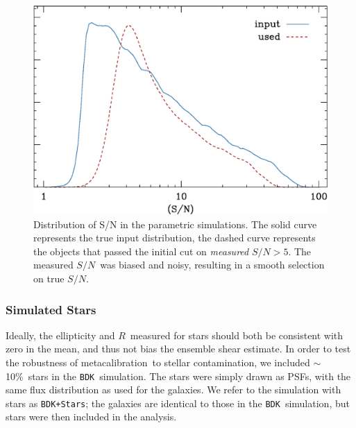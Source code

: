 \documentclass[a4paper,fleqn,usenatbib]{mnras}
\newcommand{\snr}{$S/N$}
\newcommand{\mcal}{metacalibration}
\newcommand{\mcalR}{$R$}
\newcommand{\nsimNstarperc}{10\%}
\newcommand{\bdsim}{\texttt{BDK}}
\newcommand{\bdstar}{\texttt{BDK+Stars}}
\begin{document}
\begin{figure}
    \centering
    \includegraphics[width=\columnwidth]{run-bdj03mcal02-s2n.eps}

    \caption{Distribution of S/N in the parametric simulations. The
    solid curve represents the true input distribution, the dashed curve 
	represents the objects that passed the initial cut on {\it measured}
    \snr$ > 5$. The measured \snr\ was biased and noisy,
    resulting in a smooth selection on true \snr.}

\label{fig:s2n}
\end{figure}

\subsubsection{Simulated Stars}

Ideally, the ellipticity and \mcalR\ measured for stars should both be
consistent with zero in the mean, and thus not bias the ensemble shear
estimate.  In order to test the robustness of \mcal\ to stellar contamination,
we included $\sim$\nsimNstarperc\ stars in the \bdsim\ simulation.  The stars
were simply drawn as PSFs, with the same flux distribution as used for the
galaxies.  We refer to the simulation with stars as \bdstar; the
galaxies are identical to those in the \bdsim\ simulation, but stars
were then included in the analysis.
\end{document}
